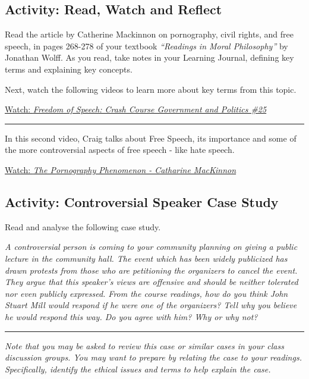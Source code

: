 \documentclass[
]{book}
\begin{document}
\hypertarget{activity-read-watch-and-reflect-6}{%
\subsection*{Activity: Read, Watch and Reflect}\label{activity-read-watch-and-reflect-6}}

\begin{reflect}
Read the article by Catherine Mackinnon on pornography, civil rights, and free speech, in pages 268-278 of your textbook \emph{``Readings in Moral Philosophy''} by Jonathan Wolff. As you read, take notes in your Learning Journal, defining key terms and explaining key concepts.

Next, watch the following videos to learn more about key terms from this topic.

\href{https://www.youtube.com/watch?v=Zeeq0qaEaLw}{Watch: \emph{Freedom of Speech: Crash Course Government and Politics \#25}}

\begin{center}\rule{0.5\linewidth}{0.5pt}\end{center}

In this second video, Craig talks about Free Speech, its importance and some of the more controversial aspects of free speech - like hate speech.

\href{https://www.youtube.com/watch?v=kdfPLJDmEIw}{Watch: \emph{The Pornography Phenomenon - Catharine MacKinnon}}
\end{reflect}

\hypertarget{activity-controversial-speaker-case-study}{%
\subsection*{Activity: Controversial Speaker Case Study}\label{activity-controversial-speaker-case-study}}

\begin{reflect}
Read and analyse the following case study.

\emph{A controversial person is coming to your community planning on giving a public lecture in the community hall. The event which has been widely publicized has drawn protests from those who are petitioning the organizers to cancel the event. They argue that this speaker's views are offensive and should be neither tolerated nor even publicly expressed. From the course readings, how do you think John Stuart Mill would respond if he were one of the organizers? Tell why you believe he would respond this way. Do you agree with him? Why or why not?}

\begin{center}\rule{0.5\linewidth}{0.5pt}\end{center}

\emph{Note that you may be asked to review this case or similar cases in your class discussion groups. You may want to prepare by relating the case to your readings. Specifically, identify the ethical issues and terms to help explain the case.}
\end{reflect}
\end{document}
